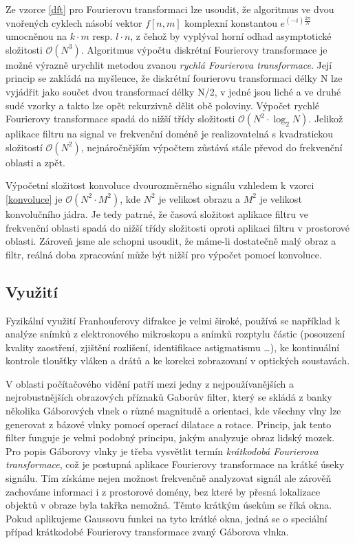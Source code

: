\documentclass[11pt,a4paper]{article}
\begin{document}
Ze vzorce \ref{dft} pro Fourierovu transformaci lze usoudit, že algoritmus ve dvou vnořených cyklech
násobí vektor $f[n,m]$ komplexní konstantou $e^{(-i)\frac{2\pi}{N}}$ umocněnou na $k\cdot m$ resp.
$l\cdot n$, z čehož by vyplýval horní odhad asymptotické složitosti $\mathcal{O}(N^3)$. 
Algoritmus výpočtu diskrétní Fourierovy transformace je možné výrazně urychlit metodou zvanou 
\textit{rychlá Fourierova transformace}. Její princip se zakládá na myšlence, že diskrétní fourierovu
transformaci délky N lze vyjádřit jako součet dvou transformací délky N/2, v jedné jsou liché a ve
druhé sudé vzorky a takto lze opět rekurzivně dělit obě poloviny. Výpočet rychlé Fourierovy transformace
spadá do nižší třídy složitosti $\mathcal{O}(N^2 \cdot \log_{2}{N})$. Jelikož aplikace filtru na signal ve
frekvenční doméně je realizovatelná s kvadratickou složitostí $\mathcal{O}(N^2)$, nejnáročnějším výpočtem
zůstává stále převod do frekvenční oblasti a zpět.

Výpočetní složitost konvoluce dvourozměrného signálu vzhledem k vzorci \ref{konvoluce} je 
$\mathcal{O}(N^2 \cdot M^2)$, kde $N^2$ je velikost obrazu a $M^2$ je velikost konvolučního jádra. Je 
tedy patrné, že časová složitost aplikace filtru ve frekvenční oblasti spadá do nižší třídy složitosti 
oproti aplikaci filtru v prostorové oblasti. Zároveň jsme ale schopni usoudit, že máme-li dostatečně
malý obraz a filtr, reálná doba zpracování může být nižší pro výpočet pomocí konvoluce.

\subsection{Využití}
Fyzikální využití Franhouferovy difrakce je velmi široké, používá se například k analýze snímků z elektronového 
mikroskopu a snímků rozptylu částic (posouzení kvality zaostření, zjištění rozlišení, identifikace astigmatismu 
\dots), ke kontinuální kontrole tloušťky vláken a drátů a ke korekci zobrazovaní v optických soustavách. 

V oblasti počítačového vidění patří mezi jedny z nejpoužívanějších a nejrobustnějších obrazových příznaků 
Gaborův filter, který se skládá z banky několika Gáborových vlnek o různé magnitudě a orientaci, kde všechny
vlny lze generovat z bázové vlnky pomocí operací dilatace a rotace. Princip, jak tento filter funguje je velmi 
podobný principu, jakým analyzuje obraz lidský mozek. Pro popis Gáborovy vlnky je třeba vysvětlit termín
\textit{krátkodobá Fourierova transformace}, což je postupná aplikace Fourierovy transformace na krátké
úseky signálu. Tím získáme nejen možnost frekvenčně analyzovat signál ale zárověň zachováme informaci i 
z prostorové domény, bez které by přesná lokalizace objektů v obraze byla takřka nemožná. Těmto krátkým
úsekům se říká okna. Pokud aplikujeme Gaussovu funkci na tyto krátké okna, jedná se o speciální případ
krátkodobé Fourierovy transformace zvaný Gáborova vlnka.
\end{document}
